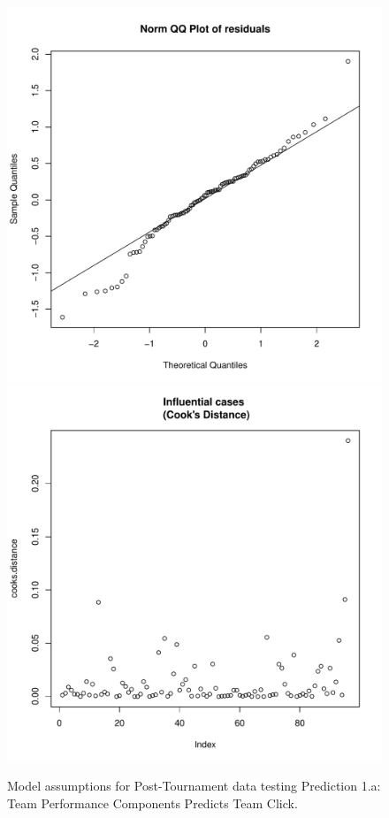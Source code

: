 \begin{CJK}{UTF8}{gbsn}
\begin{figure}[!htbp]
     \includegraphics[scale =.4]{images/MLM1aQQPlot.pdf}
     \includegraphics[scale =.4]{images/MLM1aCooksD.pdf}
     \caption{Model assumptions for Post-Tournament data testing Prediction 1.a: Team Performance Components Predicts Team Click.}
     \label{fig:MLM1aAssumptions}
 \end{figure}




\end{CJK}
